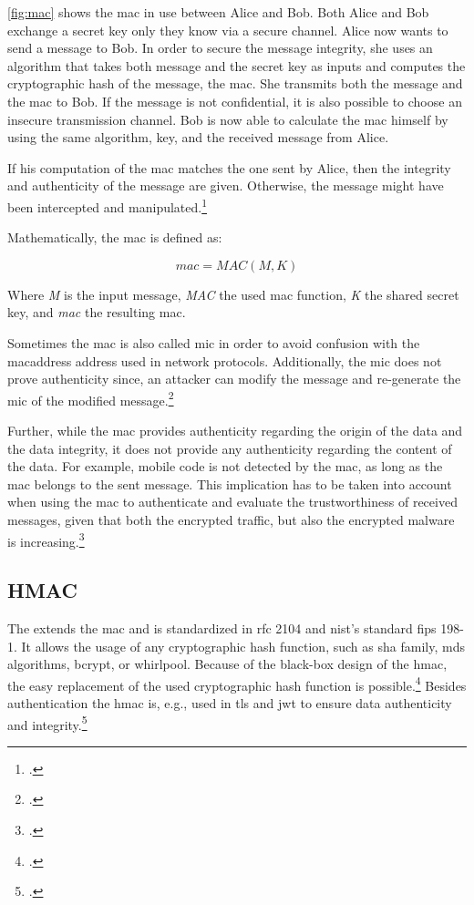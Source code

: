 \autoref{fig:mac} shows the \gls{mac} in use between Alice and Bob. Both Alice and Bob exchange a secret key only they know via a secure channel. Alice now wants to send a message to Bob. In order to secure the message integrity, she uses an algorithm that takes both message and the secret key as inputs and computes the cryptographic hash of the message, the \gls{mac}. She transmits both the message and the \gls{mac} to Bob. If the message is not confidential, it is also possible to choose an insecure transmission channel. Bob is now able to calculate the \gls{mac} himself by using the same algorithm, key, and the received message from Alice.

If his computation of the \gls{mac} matches the one sent by Alice, then the integrity and authenticity of the message are given. Otherwise, the message might have been intercepted and manipulated.\footcites[See][320]{Paar2010}

Mathematically, the \gls{mac} is defined as:

\begin{equation*}
	mac = MAC(M, K)
\end{equation*}

Where \textit{M} is the input message, \textit{MAC} the used \gls{mac} function, \textit{K} the shared secret key, and \textit{mac} the resulting \glsdesc{mac}.

Sometimes the \gls{mac} is also called \gls{mic} in order to avoid confusion with the \gls{macaddress} address used in network protocols. Additionally, the \gls{mic} does not prove authenticity since, an attacker can modify the message and re-generate the \gls{mic} of the modified message.\footcites[See][60--62]{265831}

Further, while the \gls{mac} provides authenticity regarding the origin of the data and the data integrity, it does not provide any authenticity regarding the content of the data. For example, mobile code is not detected by the \gls{mac}, as long as the \gls{mac} belongs to the sent message. This implication has to be taken into account when using the \gls{mac} to authenticate and evaluate the trustworthiness of received messages, given that both the encrypted traffic, but also the encrypted malware is increasing.\footcites[See][100]{weldon2015}

\subsection{HMAC}

The  extends the \gls{mac} and is standardized in \gls{rfc} 2104 and \gls{nist}'s standard \gls{fips} 198-1. It allows the usage of any cryptographic hash function, such as \gls{sha} family, \glspl{md} algorithms, bcrypt, or whirlpool. Because of the black-box design of the \gls{hmac}, the easy replacement of the used cryptographic hash function is possible.\footcites[See][]{krawczyk1997rfc}[See][]{FIPS198} Besides authentication the \gls{hmac} is, e.g., used in \gls{tls} and \gls{jwt} to ensure data authenticity and integrity.\footcites[See][14]{rfc5246}[See][8]{rfc7519}[See][3--4]{s2011rfc}

